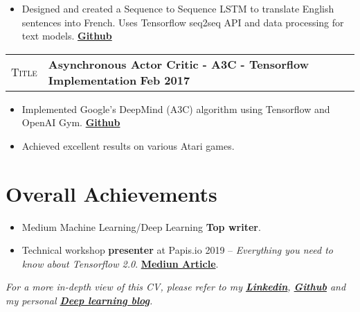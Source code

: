 \documentclass[9pt, a4paper, oneside, final]{scrartcl} %
\newcommand{\gray}{\rowcolor[gray]{.90}} %
\begin{document}
\begin{itemize}\itemsep1.2pt \parskip0pt 
\item Designed and created a Sequence to Sequence LSTM to translate English sentences into French. Uses Tensorflow seq2seq API and data processing for text models. \textbf{\href{https://github.com/sthalles/neural_machine_translation}{Github}}
\end{itemize}

\begin{center}
\begin{tabularx}{1.0\linewidth}{>{\raggedleft\scshape}p{2.2cm}X}
\gray Title & \textbf{Asynchronous Actor Critic - A3C - Tensorflow Implementation} \hfill \textbf{Feb 2017}\\
\end{tabularx}
\end{center}

\begin{itemize}\itemsep1.2pt \parskip0pt 
\item Implemented Google's DeepMind (A3C) algorithm using Tensorflow and OpenAI Gym. \textbf{\href{https://github.com/sthalles/asynchronous-advantage-actor-critic}{Github}}
\item Achieved excellent results on various Atari games. 
\end{itemize}

\section{Overall Achievements}

\begin{itemize}\itemsep1.0pt \parskip1.5pt 
\item Medium Machine Learning/Deep Learning \textbf{Top writer}.

\item Technical workshop \textbf{presenter} at Papis.io 2019 -- \textit{Everything you need to know about Tensorflow 2.0}. 
\textbf{\href{https://towardsdatascience.com/everything-you-need-to-know-about-tensorflow-2-0-b0856960c074?source=friends_link&sk=6e70f541090f2879ef2964736c5b19ad}{Mediun Article}}.

\end{itemize}

\textit{For a more in-depth view of this CV, please refer to my \textbf{\href{https://www.linkedin.com/in/thalles-silva-32ab08a3/}{Linkedin}}, \textbf{\href{https://github.com/sthalles}{Github}} and my personal \textbf{\href{https://sthalles.github.io/}{Deep learning blog}}.}
\end{document}
